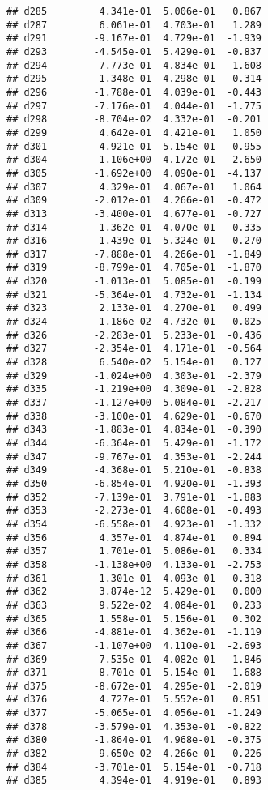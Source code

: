 \documentclass[
]{article}
\begin{document}
\begin{verbatim}
## d285         4.341e-01  5.006e-01   0.867
## d287         6.061e-01  4.703e-01   1.289
## d291        -9.167e-01  4.729e-01  -1.939
## d293        -4.545e-01  5.429e-01  -0.837
## d294        -7.773e-01  4.834e-01  -1.608
## d295         1.348e-01  4.298e-01   0.314
## d296        -1.788e-01  4.039e-01  -0.443
## d297        -7.176e-01  4.044e-01  -1.775
## d298        -8.704e-02  4.332e-01  -0.201
## d299         4.642e-01  4.421e-01   1.050
## d301        -4.921e-01  5.154e-01  -0.955
## d304        -1.106e+00  4.172e-01  -2.650
## d305        -1.692e+00  4.090e-01  -4.137
## d307         4.329e-01  4.067e-01   1.064
## d309        -2.012e-01  4.266e-01  -0.472
## d313        -3.400e-01  4.677e-01  -0.727
## d314        -1.362e-01  4.070e-01  -0.335
## d316        -1.439e-01  5.324e-01  -0.270
## d317        -7.888e-01  4.266e-01  -1.849
## d319        -8.799e-01  4.705e-01  -1.870
## d320        -1.013e-01  5.085e-01  -0.199
## d321        -5.364e-01  4.732e-01  -1.134
## d323         2.133e-01  4.270e-01   0.499
## d324         1.186e-02  4.732e-01   0.025
## d326        -2.283e-01  5.233e-01  -0.436
## d327        -2.354e-01  4.171e-01  -0.564
## d328         6.540e-02  5.154e-01   0.127
## d329        -1.024e+00  4.303e-01  -2.379
## d335        -1.219e+00  4.309e-01  -2.828
## d337        -1.127e+00  5.084e-01  -2.217
## d338        -3.100e-01  4.629e-01  -0.670
## d343        -1.883e-01  4.834e-01  -0.390
## d344        -6.364e-01  5.429e-01  -1.172
## d347        -9.767e-01  4.353e-01  -2.244
## d349        -4.368e-01  5.210e-01  -0.838
## d350        -6.854e-01  4.920e-01  -1.393
## d352        -7.139e-01  3.791e-01  -1.883
## d353        -2.273e-01  4.608e-01  -0.493
## d354        -6.558e-01  4.923e-01  -1.332
## d356         4.357e-01  4.874e-01   0.894
## d357         1.701e-01  5.086e-01   0.334
## d358        -1.138e+00  4.133e-01  -2.753
## d361         1.301e-01  4.093e-01   0.318
## d362         3.874e-12  5.429e-01   0.000
## d363         9.522e-02  4.084e-01   0.233
## d365         1.558e-01  5.156e-01   0.302
## d366        -4.881e-01  4.362e-01  -1.119
## d367        -1.107e+00  4.110e-01  -2.693
## d369        -7.535e-01  4.082e-01  -1.846
## d371        -8.701e-01  5.154e-01  -1.688
## d375        -8.672e-01  4.295e-01  -2.019
## d376         4.727e-01  5.552e-01   0.851
## d377        -5.065e-01  4.056e-01  -1.249
## d378        -3.579e-01  4.353e-01  -0.822
## d380        -1.864e-01  4.968e-01  -0.375
## d382        -9.650e-02  4.266e-01  -0.226
## d384        -3.701e-01  5.154e-01  -0.718
## d385         4.394e-01  4.919e-01   0.893

\end{verbatim}
\end{document}
